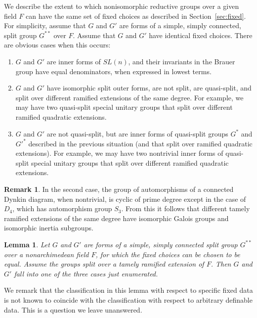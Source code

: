 \documentclass[12pt]{amsart}
\theoremstyle{plain}
\newtheorem{lem}[thm]{Lemma}
\theoremstyle{definition}
\newtheorem{rem}[thm]{Remark}
\begin{document}
We describe the extent to which nonisomorphic reductive groups over a
given field $F$ can have the same set of fixed choices as described in
Section~\ref{sec:fixed}.  For simplicity, assume that $G$ and $G'$ are
forms of a simple, simply connected, split group $G^{**}$ over $F$.
Assume that $G$ and $G'$ have identical fixed choices.  There are
obvious cases when this occurs:
\begin{enumerate}
\item $G$ and $G'$ are inner forms of $SL(n)$, and their invariants in
  the Brauer group have equal denominators, when expressed in lowest terms.
\item $G$ and $G'$ have isomorphic split outer forms, are not split,
  are quasi-split, and split over different ramified extensions of the
  same degree.  For example, we may have two quasi-split special
  unitary groups that split over different ramified quadratic
  extensions.
\item $G$ and $G'$ are not quasi-split, but are inner forms of
  quasi-split groups $G^*$ and $G'^{*}$ described in the previous
  situation (and that split over ramified quadratic extensions).  
  For example, we may have two nontrivial inner forms of
  quasi-split special unitary groups that split over different
  ramified quadratic extensions.
\end{enumerate}

\begin{rem}\label{rem:rem}
In the second case, the group of automorphisms of a connected
    Dynkin diagram, when nontrivial, is cyclic of prime degree except
    in the case of $D_4$, which has automorphism group $S_3$.  From
    this it follows that different tamely ramified extensions of the
    same degree have isomorphic Galois groups and isomorphic inertia
    subgroups.
\end{rem}

\begin{lem} Let $G$ and $G'$ are forms of a simple, simply connected
  split group $G^{**}$ over a nonarchimedean field $F$, for which the
  fixed choices can be chosen to be equal.  Assume the groups split
  over a tamely ramified extension of $F$.  Then $G$ and $G'$ fall
  into one of the three cases just enumerated.
\end{lem}

We remark that the classification in this lemma with respect to
specific fixed data is not known to coincide with the classification
with respect to arbitrary definable data.  This is a question we leave
unanswered.
\end{document}
